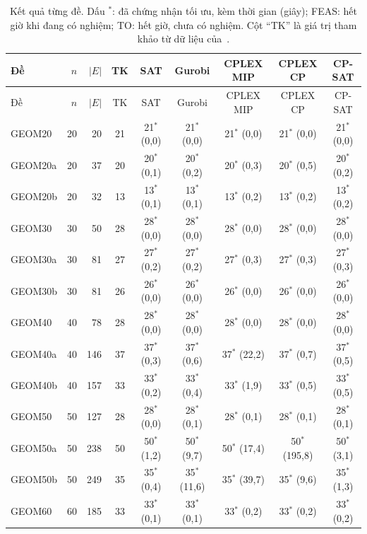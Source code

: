 \begin{longtable}{lrrcccccc}
\caption{Kết quả từng đề. Dấu $^{*}$: đã chứng nhận tối ưu, kèm thời gian (giây); FEAS: hết giờ khi đang có nghiệm; TO: hết giờ, chưa có nghiệm. Cột ``TK'' là giá trị tham khảo từ dữ liệu của~\citet{nguyen2026bcp}.}\label{tab:detail}\\
\toprule
Đề & $n$ & $|E|$ & TK & SAT & Gurobi & CPLEX MIP & CPLEX CP & CP-SAT \\
\midrule
\endfirsthead
\toprule
Đề & $n$ & $|E|$ & TK & SAT & Gurobi & CPLEX MIP & CPLEX CP & CP-SAT \\
\midrule
\endhead
\bottomrule
\endlastfoot
GEOM20 & 20 & 20 & 21 & 21$^{*}$ (0,0) & 21$^{*}$ (0,0) & 21$^{*}$ (0,0) & 21$^{*}$ (0,0) & 21$^{*}$ (0,0) \\
GEOM20a & 20 & 37 & 20 & 20$^{*}$ (0,1) & 20$^{*}$ (0,2) & 20$^{*}$ (0,3) & 20$^{*}$ (0,5) & 20$^{*}$ (0,2) \\
GEOM20b & 20 & 32 & 13 & 13$^{*}$ (0,1) & 13$^{*}$ (0,1) & 13$^{*}$ (0,2) & 13$^{*}$ (0,2) & 13$^{*}$ (0,2) \\
GEOM30 & 30 & 50 & 28 & 28$^{*}$ (0,0) & 28$^{*}$ (0,0) & 28$^{*}$ (0,0) & 28$^{*}$ (0,0) & 28$^{*}$ (0,0) \\
GEOM30a & 30 & 81 & 27 & 27$^{*}$ (0,2) & 27$^{*}$ (0,2) & 27$^{*}$ (0,3) & 27$^{*}$ (0,3) & 27$^{*}$ (0,3) \\
GEOM30b & 30 & 81 & 26 & 26$^{*}$ (0,0) & 26$^{*}$ (0,0) & 26$^{*}$ (0,0) & 26$^{*}$ (0,0) & 26$^{*}$ (0,0) \\
GEOM40 & 40 & 78 & 28 & 28$^{*}$ (0,0) & 28$^{*}$ (0,0) & 28$^{*}$ (0,0) & 28$^{*}$ (0,0) & 28$^{*}$ (0,0) \\
GEOM40a & 40 & 146 & 37 & 37$^{*}$ (0,3) & 37$^{*}$ (0,6) & 37$^{*}$ (22,2) & 37$^{*}$ (0,7) & 37$^{*}$ (0,5) \\
GEOM40b & 40 & 157 & 33 & 33$^{*}$ (0,2) & 33$^{*}$ (0,4) & 33$^{*}$ (1,9) & 33$^{*}$ (0,5) & 33$^{*}$ (0,5) \\
GEOM50 & 50 & 127 & 28 & 28$^{*}$ (0,0) & 28$^{*}$ (0,1) & 28$^{*}$ (0,1) & 28$^{*}$ (0,1) & 28$^{*}$ (0,1) \\
GEOM50a & 50 & 238 & 50 & 50$^{*}$ (1,2) & 50$^{*}$ (9,7) & 50$^{*}$ (17,4) & 50$^{*}$ (195,8) & 50$^{*}$ (3,1) \\
GEOM50b & 50 & 249 & 35 & 35$^{*}$ (0,4) & 35$^{*}$ (11,6) & 35$^{*}$ (39,7) & 35$^{*}$ (9,6) & 35$^{*}$ (1,3) \\
GEOM60 & 60 & 185 & 33 & 33$^{*}$ (0,1) & 33$^{*}$ (0,1) & 33$^{*}$ (0,2) & 33$^{*}$ (0,2) & 33$^{*}$ (0,2) \\

\end{longtable}
